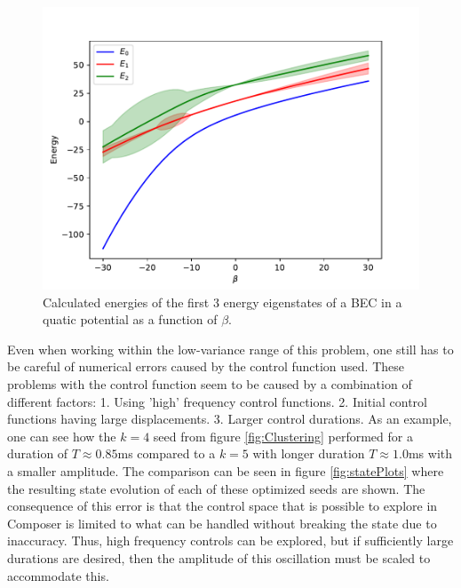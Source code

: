 \documentclass[a4paper, twocolumn]{revtex4-1}
\begin{document}
\begin{figure}
	\includegraphics[width=\columnwidth]{graphics/stateAnalysis/Energylevels.pdf}
	\caption{Calculated energies of the first 3 energy eigenstates of a BEC in a quatic potential as a function of $\beta$.}
	\label{fig:energyLevels}
\end{figure}

Even when working within the low-variance range of this problem, one still has to be careful of numerical errors caused by the control function used. These problems with the control function seem to be caused by a combination of different factors: 1. Using 'high' frequency control functions. 2. Initial control functions having large displacements. 3. Larger control durations. As an example, one can see how the $k=4$ seed from figure \ref{fig:Clustering} performed for a duration of $T\approx 0.85$ms compared to a $k=5$ with longer duration  $T\approx 1.0$ms with a smaller amplitude. The comparison can be seen in figure \ref{fig:statePlots} where the resulting state evolution of each of these optimized seeds are shown. The consequence of this error is that the control space that is possible to explore in Composer is limited to what can be handled without breaking the state due to inaccuracy. Thus, high frequency controls can be explored, but if sufficiently large durations are desired, then the amplitude of this oscillation must be scaled to accommodate this.
\end{document}
